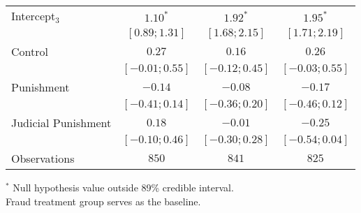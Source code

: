 \begin{table}[h]
\begin{center}
\begin{threeparttable}
\begin{tabular}{l c c c}
Intercept$_3$       & $1.10^{*}$        & $1.92^{*}$        & $1.95^{*}$        \\
                    & $ [ 0.89;  1.31]$ & $ [ 1.68;  2.15]$ & $ [ 1.71;  2.19]$ \\
Control             & $0.27$            & $0.16$            & $0.26$            \\
                    & $ [-0.01;  0.55]$ & $ [-0.12;  0.45]$ & $ [-0.03;  0.55]$ \\
Punishment          & $-0.14$           & $-0.08$           & $-0.17$           \\
                    & $ [-0.41;  0.14]$ & $ [-0.36;  0.20]$ & $ [-0.46;  0.12]$ \\
Judicial Punishment & $0.18$            & $-0.01$           & $-0.25$           \\
                    & $ [-0.10;  0.46]$ & $ [-0.30;  0.28]$ & $ [-0.54;  0.04]$ \\
\hline
Observations        & $850$             & $841$             & $825$             \\
\hline
\end{tabular}
\begin{tablenotes}[flushleft]
\scriptsize{$^*$ Null hypothesis value outside 89\% credible interval.  \\
Fraud treatment group serves as the baseline.}
\end{tablenotes}
\end{threeparttable}
\label{table:coefficients}
\end{center}
\end{table}
